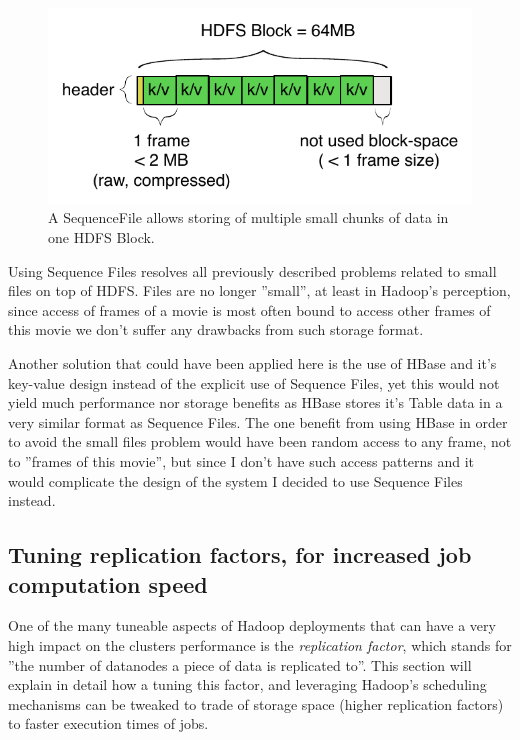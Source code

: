 \begin{figure}[ch!]
  \centering
  \includegraphics[scale=0.9]{diagrams/sequence-file.pdf}
  \caption{A SequenceFile allows storing of multiple small chunks of data in one HDFS Block.}
  \label{fig:sequence-file}
\end{figure}

Using Sequence Files resolves all previously described problems related to small files on top of HDFS. Files are no longer ''small'', at least in Hadoop's perception,
since access of frames of a movie is most often bound to access other frames of this movie we don't suffer any drawbacks from such storage format.

Another solution that could have been applied here is the use of HBase and it's key-value design instead of the explicit use of Sequence Files, yet this would not yield much performance nor storage benefits as HBase stores it's Table data in a very similar format as Sequence Files. The one benefit from using HBase in order to avoid the small files problem would have been random access to any frame, not to ''frames of this movie'', but since I don't have such access patterns and it would complicate the design of the system I decided to use Sequence Files instead.



\subsection{Tuning replication factors, for increased job computation speed}
\label{sec:tuning-replication-factors}
One of the many tuneable aspects of Hadoop deployments that can have a very high impact on the clusters performance is the \textit{replication factor}, which stands for ''the number of datanodes a piece of data is replicated to''. This section will explain in detail how a tuning this factor, and leveraging Hadoop's scheduling mechanisms can be tweaked to trade of storage space (higher replication factors) to faster execution times of jobs.

